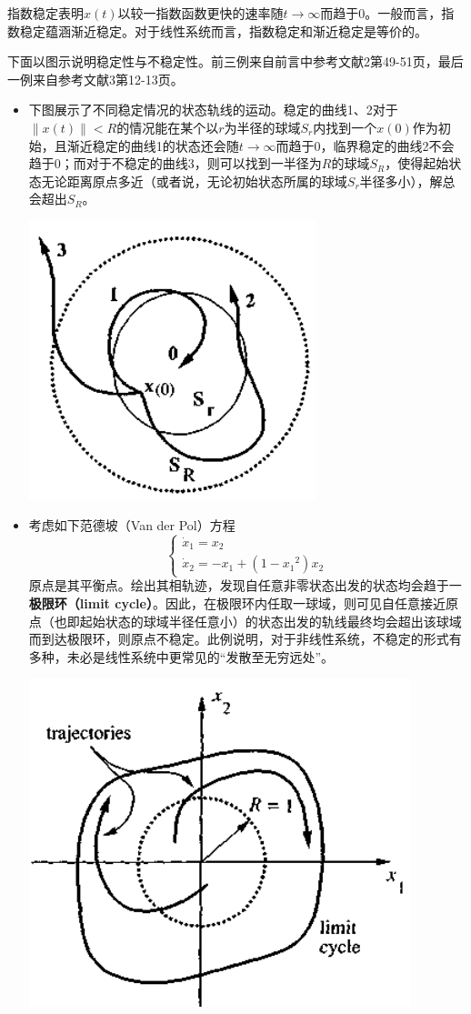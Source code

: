 \begin{note}
  指数稳定表明$x(t)$以较一指数函数更快的速率随$t\to\infty$而趋于$0$。一般而言，指数稳定蕴涵渐近稳定。对于线性系统而言，指数稳定和渐近稳定是等价的。
\end{note}
下面以图示说明稳定性与不稳定性。前三例来自前言中参考文献2第49-51页，最后一例来自参考文献3第12-13页。
\newpage
\begin{example}[稳定与不稳定的图示]\label{stable_unstable}
  \begin{itemize}[leftmargin=1em]
    \item 下图展示了不同稳定情况的状态轨线的运动。稳定的曲线1、2对于$\|x(t)\|<R$的情况能在某个以$r$为半径的球域$S_r$内找到一个$x(0)$作为初始，且渐近稳定的曲线1的状态还会随$t\to\infty$而趋于$0$，临界稳定的曲线2不会趋于$0$；而对于不稳定的曲线3，则可以找到一半径为$R$的球域$S_R$，使得起始状态无论距离原点多近（或者说，无论初始状态所属的球域$S_r$半径多小），解总会超出$S_R$。
    \begin{center}
      \includegraphics[width=0.3\linewidth]{figure/nonlinear/stable.png}
    \end{center}
    \item 考虑如下范德坡（Van der Pol）方程\[\begin{cases}
      \dot{x}_{1}=x_{2}\\\dot{x}_{2}=- x_{1}+(1-{x_{1}}^{2})x_{2}
    \end{cases}\]
    原点是其平衡点。绘出其相轨迹，发现自任意非零状态出发的状态均会趋于一{\bf 极限环（limit cycle）}。因此，在极限环内任取一球域，则可见自任意接近原点（也即起始状态的球域半径任意小）的状态出发的轨线最终均会超出该球域而到达极限环，则原点不稳定。此例说明，对于非线性系统，不稳定的形式有多种，未必是线性系统中更常见的“发散至无穷远处”。
    \begin{center}
      \includegraphics[width=0.34\linewidth]{figure/nonlinear/vanderpol.png}

\end{center}
\end{itemize}
\end{example}
